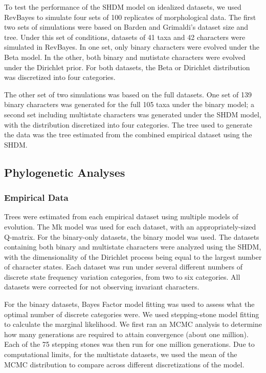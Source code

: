 \documentclass[]{article}
\begin{document}
To test the performance of the SHDM model on idealized datasets, we used RevBayes to simulate four sets of 100 replicates of morphological data.
The first two sets of simulations were based on Barden and Grimaldi's dataset size and tree.
Under this set of conditions, datasets of 41 taxa and 42 characters were simulated in RevBayes.
In one set, only binary characters were evolved under the Beta model.
In the other, both binary and mutistate characters were evolved under the Dirichlet prior.
For both datasets, the Beta or Dirichlet distribution was discretized into four categories.
\par
The other set of two simulations was based on the full datasets.
One set of 139 binary characters was generated for the full 105 taxa under the binary model; a second set including multistate characters was generated under the SHDM model, with the distribution discretized into four categories.
The tree used to generate the data was the tree estimated from the combined empirical dataset using the SHDM. \par

\subsection{Phylogenetic Analyses}
\subsubsection{Empirical Data}

Trees were estimated from each empirical dataset using multiple models of evolution.
The Mk model was used for each dataset, with an appropriately-sized Q-matrix.
For the binary-only datasets, the binary model was used.
The datasets containing both binary and multistate characters were analyzed using the SHDM, with the dimensionality of the Dirichlet process being equal to the largest number of character states. 
Each dataset was run under several different numbers of discrete state frequency variation categories, from two to six categories.
All datasets were corrected for not observing invariant characters. \par
For the binary datasets, Bayes Factor model fitting was used to assess what the optimal number of discrete categories were.
We used stepping-stone model fitting to calculate the marginal likelihood.
We first ran an MCMC analysis to determine how many generations are required to attain convergence (about one million).
Each of the 75 stepping stones was then run for one million generations.
Due to computational limits, for the multistate datasets, we used the mean of the MCMC distribution to compare across different discretizations of the model. \par
\end{document}
